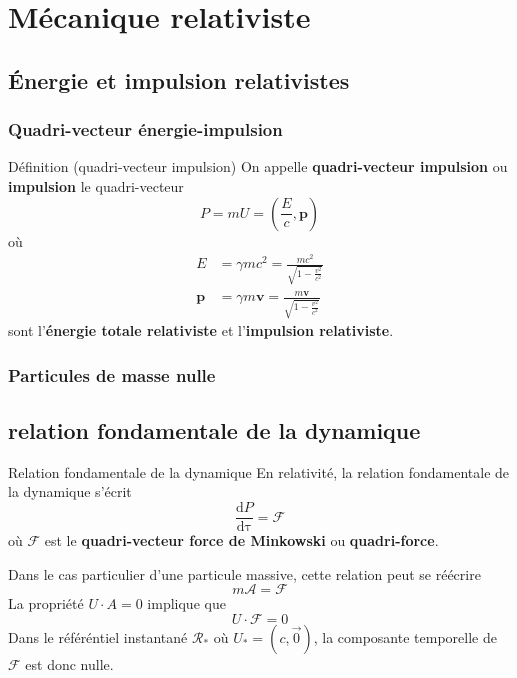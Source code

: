 \section{Mécanique relativiste}

    \subsection{Énergie et impulsion relativistes}

        \subsubsection{Quadri-vecteur énergie-impulsion}

        \begin{omed}{Définition (quadri-vecteur impulsion)}
            On appelle \textbf{quadri-vecteur impulsion} ou \textbf{impulsion} le quadri-vecteur 
            \[ P = m U = \left(\frac{E}{c}, \mathbf{p}\right) \] 
            où  
            \begin{align*}
                E &= \gamma m c^2 = \frac{mc^2}{\sqrt{1 - \frac{v^2}{c^2}}} \\
                \mathbf{p} &= \gamma m \mathbf{v} = \frac{m \mathbf{v}}{\sqrt{1 - \frac{v^2}{c^2}}}
            \end{align*}
            sont l’\textbf{énergie totale relativiste} et l’\textbf{impulsion relativiste}.
        \end{omed}

        \subsubsection{Particules de masse nulle}

    \subsection{relation fondamentale de la dynamique}

    \begin{omed}{Relation fondamentale de la dynamique}
        En relativité, la relation fondamentale de la dynamique s’écrit
        \[ \frac{\text{d}P}{\text{d}\uptau} = \mathcal{F} \]   
        où $\mathcal{F}$ est le \textbf{quadri-vecteur force de Minkowski} ou \textbf{quadri-force}. 
    \end{omed}

    Dans le cas particulier d’une particule massive, cette relation peut se réécrire 
    \[ m \mathcal{A} = \mathcal{F} \]   
    La propriété $U \cdot A = 0$ implique que
    \[ U \cdot \mathcal{F} = 0 \]   
    Dans le référéntiel instantané $\mathcal{R}_*$ où $U_* = \left(c, \vec{0}\right)$, la composante temporelle de $\mathcal{F}$ est donc nulle.

        